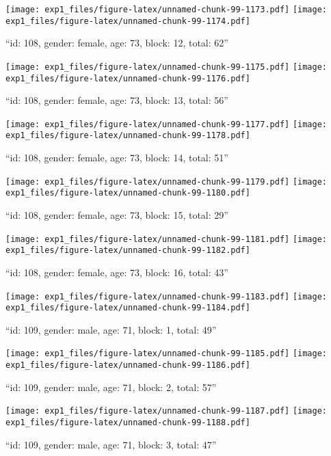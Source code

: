 \documentclass[,]{article}
\begin{document}
\texttt{[image: exp1\_files/figure-latex/unnamed-chunk-99-1173.pdf]}
\texttt{[image: exp1\_files/figure-latex/unnamed-chunk-99-1174.pdf]}

\newpage
[1] 

``id: 108, gender: female, age: 73, block: 12, total: 62''

\texttt{[image: exp1\_files/figure-latex/unnamed-chunk-99-1175.pdf]}
\texttt{[image: exp1\_files/figure-latex/unnamed-chunk-99-1176.pdf]}

\newpage
[1] 

``id: 108, gender: female, age: 73, block: 13, total: 56''

\texttt{[image: exp1\_files/figure-latex/unnamed-chunk-99-1177.pdf]}
\texttt{[image: exp1\_files/figure-latex/unnamed-chunk-99-1178.pdf]}

\newpage
[1] 

``id: 108, gender: female, age: 73, block: 14, total: 51''

\texttt{[image: exp1\_files/figure-latex/unnamed-chunk-99-1179.pdf]}
\texttt{[image: exp1\_files/figure-latex/unnamed-chunk-99-1180.pdf]}

\newpage
[1] 

``id: 108, gender: female, age: 73, block: 15, total: 29''

\texttt{[image: exp1\_files/figure-latex/unnamed-chunk-99-1181.pdf]}
\texttt{[image: exp1\_files/figure-latex/unnamed-chunk-99-1182.pdf]}

\newpage
[1] 

``id: 108, gender: female, age: 73, block: 16, total: 43''

\texttt{[image: exp1\_files/figure-latex/unnamed-chunk-99-1183.pdf]}
\texttt{[image: exp1\_files/figure-latex/unnamed-chunk-99-1184.pdf]}

\newpage
[1] 

``id: 109, gender: male, age: 71, block: 1, total: 49''

\texttt{[image: exp1\_files/figure-latex/unnamed-chunk-99-1185.pdf]}
\texttt{[image: exp1\_files/figure-latex/unnamed-chunk-99-1186.pdf]}

\newpage
[1] 

``id: 109, gender: male, age: 71, block: 2, total: 57''

\texttt{[image: exp1\_files/figure-latex/unnamed-chunk-99-1187.pdf]}
\texttt{[image: exp1\_files/figure-latex/unnamed-chunk-99-1188.pdf]}

\newpage
[1] 

``id: 109, gender: male, age: 71, block: 3, total: 47''
\end{document}
